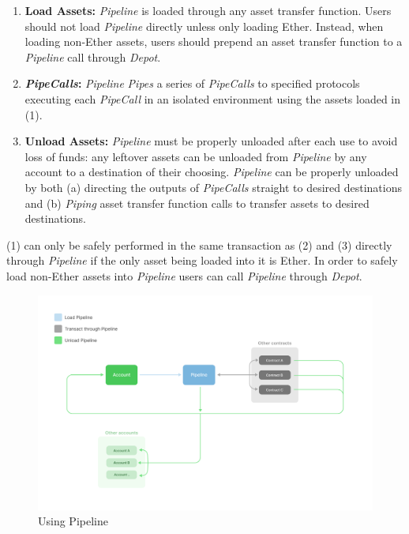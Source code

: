 \documentclass[tikz]{article}
\newcommand{\term}[1]{\textsl{#1}}
\begin{document}
\begin{enumerate}
    \item \textbf{Load Assets:} \term{Pipeline} is loaded through any asset transfer function. Users should not load \term{Pipeline} directly unless only loading Ether. Instead, when loading non-Ether assets, users should prepend an asset transfer function to a \term{Pipeline} call through \term{Depot}.
    \item \textbf{\term{PipeCalls}:} \term{Pipeline} \term{Pipes} a series of \term{PipeCalls} to specified protocols executing each \term{PipeCall} in an isolated environment using the assets loaded in (1).
    \item \textbf{Unload Assets:} \term{Pipeline} must be properly unloaded after each use to avoid loss of funds: any leftover assets can be unloaded from \term{Pipeline} by any account to a destination of their choosing. \term{Pipeline} can be properly unloaded by both (a) directing the outputs of \term{PipeCalls} straight to desired destinations and (b) \term{Piping} asset transfer function calls to transfer assets to desired destinations.
\end{enumerate}

(1) can only be safely performed in the same transaction as (2) and (3) directly through \term{Pipeline} if the only asset being loaded into it is Ether. In order to safely load non-Ether assets into \term{Pipeline} users can call \term{Pipeline} through \term{Depot}. 

\begin{figure}[h!]
    \centering
    \includegraphics[scale=.65]{Figure1}
    \vspace*{-5mm}
    \caption{Using Pipeline}
    \label{fig 1}
\end{figure}
\end{document}
